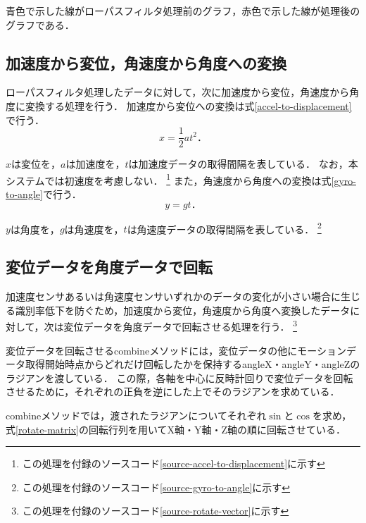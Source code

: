 青色で示した線がローパスフィルタ処理前のグラフ，赤色で示した線が処理後のグラフである．

\subsection{加速度から変位，角速度から角度への変換}
ローパスフィルタ処理したデータに対して，次に加速度から変位，角速度から角度に変換する処理を行う．
加速度から変位への変換は式\ref{accel-to-displacement}で行う．
\begin{equation}
\label{accel-to-displacement}
x = \frac{1}{2} a t^2．
\end{equation}

$x$は変位を，$a$は加速度を，$t$は加速度データの取得間隔を表している．
なお，本システムでは初速度を考慮しない．
\footnote{この処理を付録のソースコード\ref{source-accel-to-displacement}に示す}
また，角速度から角度への変換は式\ref{gyro-to-angle}で行う．
\begin{equation}
\label{gyro-to-angle}
y = g t．
\end{equation}

$y$は角度を，$g$は角速度を，$t$は角速度データの取得間隔を表している．
\footnote{この処理を付録のソースコード\ref{source-gyro-to-angle}に示す}

\subsection{変位データを角度データで回転}
加速度センサあるいは角速度センサいずれかのデータの変化が小さい場合に生じる識別率低下を防ぐため，加速度から変位，角速度から角度へ変換したデータに対して，次は変位データを角度データで回転させる処理を行う．
\footnote{この処理を付録のソースコード\ref{source-rotate-vector}に示す}

変位データを回転させるcombineメソッドには，変位データの他にモーションデータ取得開始時点からどれだけ回転したかを保持するangleX・angleY・angleZのラジアンを渡している．
この際，各軸を中心に反時計回りで変位データを回転させるために，それぞれの正負を逆にした上でそのラジアンを求めている．

combineメソッドでは，渡されたラジアンについてそれぞれ$\sin$と$\cos$を求め，式\ref{rotate-matrix}の回転行列を用いてX軸・Y軸・Z軸の順に回転させている．

